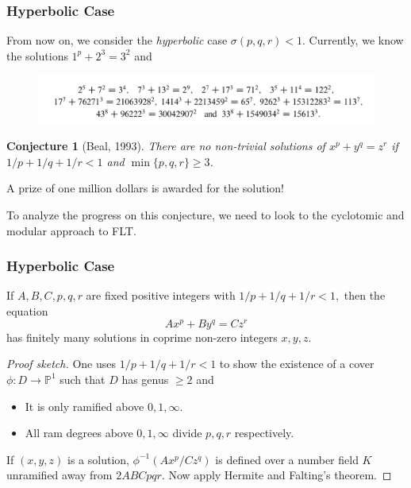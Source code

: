\documentclass{beamer}
\newcommand{\NN}{\mathbb{N}}
\theoremstyle{plain}
\newtheorem{conjecture}[thm]{Conjecture}
\begin{document}
\begin{frame}
    \frametitle{Hyperbolic Case}
    From now on, we consider the \textit{hyperbolic} case $\sigma(p,q,r)<1$. Currently, we know the solutions $1^p+2^3=3^2$ and 
    \begin{figure}
        \includegraphics[scale=0.34]{beal_examples.png}
    \end{figure}
    \begin{conjecture}[Beal, 1993]
        There are no non-trivial solutions of $x^p+y^q=z^r$ if $1/p+1/q+1/r<1$ and $\min\{p,q,r\}\geq 3$.
    \end{conjecture}
    A prize of one million dollars is awarded for the solution!
    
    To analyze the progress on this conjecture, we need to look to the cyclotomic and modular approach to FLT. 
\end{frame}


\begin{frame}
    \frametitle{Hyperbolic Case}
    \begin{theorem}
        If $A,B,C,p,q,r$ are fixed positive integers with
        $1/p+1/q+1/r<1,$
        then the equation 
        $$Ax^p+By^q=Cz^r$$
        has finitely many solutions in coprime non-zero integers $x,y,z$.
    \end{theorem}
    \begin{proof}[Proof sketch]
        One uses $1/p+1/q+1/r<1$ to show the existence of a cover $\phi:D\to\mathbb{P}^1$ such that $D$ has genus $\geq 2$ and
        \begin{itemize}
            \item It is only ramified above $0,1,\infty$.
            \item All ram degrees above $0,1,\infty$ divide $p,q,r$ respectively.
        \end{itemize}
        If $(x,y,z)$ is a solution, $\phi^{-1}(Ax^p/Cz^q)$ is defined over a number field $K$ unramified away from $2ABCpqr$. Now apply Hermite and Falting's theorem.
    \end{proof}
\end{frame}
\end{document}
